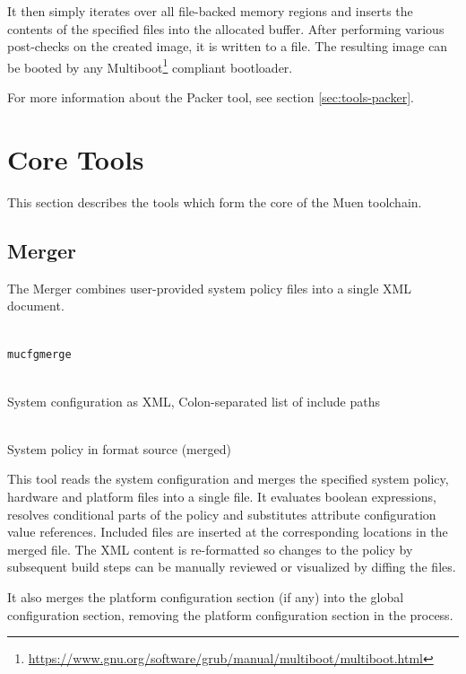 \documentclass[a4paper,twoside,titlepage]{article}
\begin{document}
It then simply iterates over all file-backed memory regions and inserts the
contents of the specified files into the allocated buffer. After performing
various post-checks on the created image, it is written to a file. The
resulting image can be booted by any
Multiboot\footnote{\url{https://www.gnu.org/software/grub/manual/multiboot/multiboot.html}}
compliant bootloader.

For more information about the Packer tool, see section \ref{sec:tools-packer}.

\section{Core Tools}
\label{sec:tools}

This section describes the tools which form the core of the Muen toolchain.

\subsection{Merger}
\label{sec:tools-merger}
The Merger combines user-provided system policy files into a single XML
document.

\begin{description} \itemsep1pt \parskip0pt
	\item[Name] \hfill \\
		\texttt{mucfgmerge}
	\item[Input] \hfill \\
		System configuration as XML, Colon-separated list of include paths
	\item[Output] \hfill \\
		System policy in format source (merged)
\end{description}

This tool reads the system configuration and merges the specified system
policy, hardware and platform files into a single file. It evaluates boolean
expressions, resolves conditional parts of the policy and substitutes attribute
configuration value references. Included files are inserted at the
corresponding locations in the merged file. The XML content is re-formatted so
changes to the policy by subsequent build steps can be manually reviewed or
visualized by diffing the files.

It also merges the platform configuration section (if any) into the global
configuration section, removing the platform configuration section in the
process.
\end{document}
